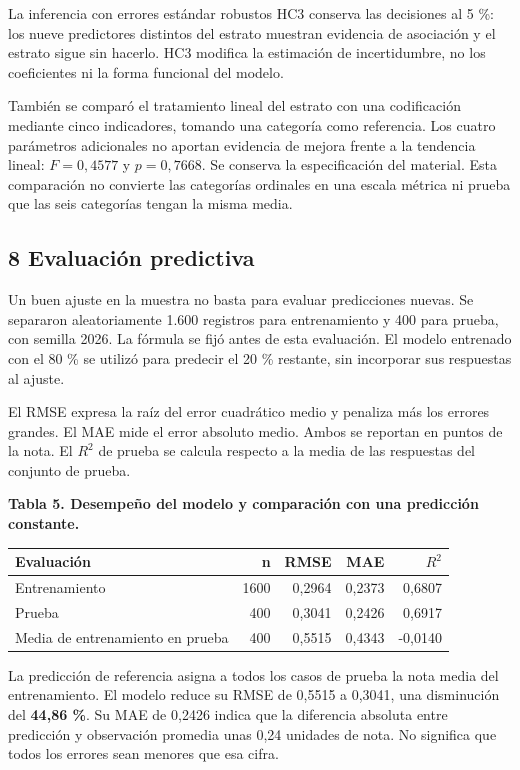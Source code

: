\documentclass[
  11pt,
  letterpaper,
]{article}
\begin{document}
La inferencia con errores estándar robustos HC3 conserva las decisiones
al 5 \%: los nueve predictores distintos del estrato muestran evidencia
de asociación y el estrato sigue sin hacerlo. HC3 modifica la estimación
de incertidumbre, no los coeficientes ni la forma funcional del modelo.

También se comparó el tratamiento lineal del estrato con una
codificación mediante cinco indicadores, tomando una categoría como
referencia. Los cuatro parámetros adicionales no aportan evidencia de
mejora frente a la tendencia lineal: \(F=0{,}4577\) y \(p=0{,}7668\). Se
conserva la especificación del material. Esta comparación no convierte
las categorías ordinales en una escala métrica ni prueba que las seis
categorías tengan la misma media.

\newpage

\hypertarget{evaluaciuxf3n-predictiva}{%
\subsection{8 Evaluación predictiva}\label{evaluaciuxf3n-predictiva}}

Un buen ajuste en la muestra no basta para evaluar predicciones nuevas.
Se separaron aleatoriamente 1.600 registros para entrenamiento y 400
para prueba, con semilla 2026. La fórmula se fijó antes de esta
evaluación. El modelo entrenado con el 80 \% se utilizó para predecir el
20 \% restante, sin incorporar sus respuestas al ajuste.

El RMSE expresa la raíz del error cuadrático medio y penaliza más los
errores grandes. El MAE mide el error absoluto medio. Ambos se reportan
en puntos de la nota. El \(R^2\) de prueba se calcula respecto a la
media de las respuestas del conjunto de prueba.

\textbf{Tabla 5. Desempeño del modelo y comparación con una predicción
constante.}

\begin{longtable}[]{@{}lrrrr@{}}
\toprule\noalign{}
Evaluación & n & RMSE & MAE & \(R^2\) \\
\midrule\noalign{}
\endhead
\bottomrule\noalign{}
\endlastfoot
Entrenamiento & 1600 & 0,2964 & 0,2373 & 0,6807 \\
Prueba & 400 & 0,3041 & 0,2426 & 0,6917 \\
Media de entrenamiento en prueba & 400 & 0,5515 & 0,4343 & -0,0140 \\
\end{longtable}

La predicción de referencia asigna a todos los casos de prueba la nota
media del entrenamiento. El modelo reduce su RMSE de 0,5515 a 0,3041,
una disminución del \textbf{44,86 \%}. Su MAE de 0,2426 indica que la
diferencia absoluta entre predicción y observación promedia unas 0,24
unidades de nota. No significa que todos los errores sean menores que
esa cifra.
\end{document}
